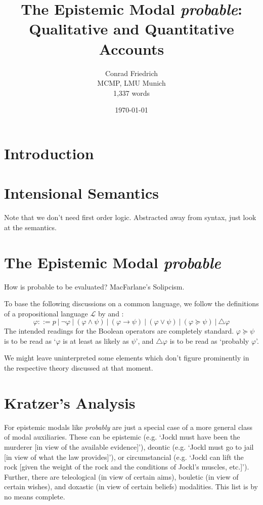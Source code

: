 \documentclass{article}
\title{The Epistemic Modal \emph{probable}: Qualitative and Quantitative Accounts}
\author{Conrad Friedrich \\ MCMP, LMU Munich \\ 1,337 words}
\date{\today}
\renewcommand{\L}{\mathcal{L}}
\begin{document}
\onehalfspacing
\maketitle

\section{Introduction}
\section{Intensional Semantics}
Note that we don't need first order logic. 
Abstracted away from syntax, just look at the semantics.
\section{The Epistemic Modal \emph{probable}}
How is probable to be evaluated? MacFarlane's Solipcism. 

To base the following discussions on a common language, we follow the definitions of a propositional language $\L$ by \textcite{harrison-trainor17_prefer} and \textcite{holliday13_measur}:
\[
\varphi ::= p ~|~ \neg \varphi ~|~ (\varphi \land \psi) ~|~ (\varphi \rightarrow \psi) ~|~ (\varphi \vee \psi) ~|~ (\varphi \succeq \psi) ~|~ \triangle\varphi 
\]
The intended readings for the Boolean operators are completely standard.
$\varphi \succeq \psi$ is to be read as `$\varphi$ is at least as likely as $\psi$', and $\triangle \varphi$ is to be read as `probably $\varphi$'.

We might leave uninterpreted some elements which don't figure prominently in the respective theory discussed at that moment.

\section{Kratzer's Analysis}

For \textcite{kratzer91_modal} epistemic modals like \emph{probably} are just a special case of a more general class of modal auxiliaries.
These can be epistemic (e.g. `Jockl must have been the murderer [in view of the available evidence]'), deontic (e.g. `Jockl must go to jail [in view of what the law provides]'), or circumstancial (e.g. `Jockl can lift the rock [given the weight of the rock and the conditions of Jockl's muscles, etc.]').
Further, there are teleological (in view of certain aims), bouletic (in view of certain wishes), and doxastic (in view of certain beliefs) modalities.
This list is by no means complete.
\end{document}
